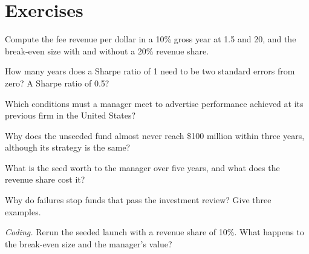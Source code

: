 \section{Exercises}

\begin{exercise}[$\star$]\label{exo:fm:launching-a-fund-and-raising-capital:1}
Compute the fee revenue per dollar in a 10\% gross year at 1.5 and 20, and the break-even size with and without a 20\% revenue share.
\end{exercise}

\begin{exercise}[$\star$]\label{exo:fm:launching-a-fund-and-raising-capital:2}
How many years does a Sharpe ratio of 1 need to be two standard errors from zero? A Sharpe ratio of 0.5?
\end{exercise}

\begin{exercise}[$\star$]\label{exo:fm:launching-a-fund-and-raising-capital:3}
Which conditions must a manager meet to advertise performance achieved at its previous firm in the United States?
\end{exercise}

\begin{exercise}[$\star\star$]\label{exo:fm:launching-a-fund-and-raising-capital:4}
Why does the unseeded fund almost never reach \$100 million within three years, although its strategy is the same?
\end{exercise}

\begin{exercise}[$\star\star$]\label{exo:fm:launching-a-fund-and-raising-capital:5}
What is the seed worth to the manager over five years, and what does the revenue share cost it?
\end{exercise}

\begin{exercise}[$\star\star$]\label{exo:fm:launching-a-fund-and-raising-capital:6}
Why do  failures stop funds that pass the investment review? Give three examples.
\end{exercise}

\begin{exercise}[$\star\star\star$]\label{exo:fm:launching-a-fund-and-raising-capital:7}
\emph{Coding.} Rerun the seeded launch with a revenue share of 10\%. What happens to the break-even size and the manager's value?
\end{exercise}

